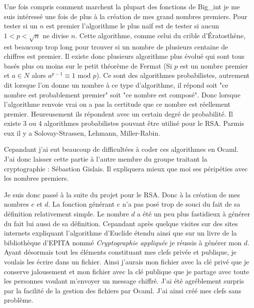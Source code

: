 \documentclass[a4paper,12pt]{article}
\begin{document}
		Une fois compris comment marchent la plupart des fonctions de Big\_int je me suis intéressé une fois de plus à la création de 
		mes grand nombres premiers.	Pour tester si un $n$ est premier l'algorithme le plus naïf est de tester si aucun $1 < p < 
		\sqrt{n} $ ne divise $n$. Cette algorithme, comme celui  du crible d'Ératosthène, est beaucoup trop long pour trouver si un 
		nombre de plusieurs centaine de chiffres est premier. Il existe donc plusieurs algorithme plus évolué qui sont tous basés 
		plus ou moins sur le petit théorème de Fermat (Si $p$ est un nombre premier et $a \in N $ alors $a^{p - 1} \equiv 
		 1 \textrm{ mod } p$). Ce sont des algorithmes probabilistes, autrement dit lorsque l'on donne un nombre à ce type 
		 d'algorithme, il répond soit "ce nombre est probablement premier" soit "ce nombre est composé". Donc lorsque l'algorithme 
		 renvoie vrai on a pas la certitude que ce nombre est réellement premier. Heureusement ils répondent avec un certain degré de 
		 probabilité. Il existe 3 ou 4 algorithmes probabilistes pouvant être utilisé pour le RSA. Parmis eux il y a Solovay-Strassen, 
		 Lehmann, Miller-Rabin.
		 
		 Cepandant j'ai eut beaucoup de difficultées à coder ces algorithmes en Ocaml. J'ai donc laisser cette partie à l'autre membre 
		 du groupe traitant la cryptographie : Sébastion Gislais. Il expliquera mieux que moi ses péripéties avec les nombres 	
		 premiers.
		 
		 Je suis donc passé à la suite du projet pour le RSA. Donc à la création de mes nombres $e$ et $d$. La fonction générant $e$
		 n'a pas posé trop de souci du fait de sa définition relativement simple. Le nombre $d$ a été un peu plus fastidieux à
		 générer du fait lui aussi de sa définition. Cepandant après quelque visites sur des sites internets expliquant l'algorithme
		 d'Euclide étendu ainsi que sur un livre de la bibliothèque d'EPITA nommé \textit{Cryptographie appliquée} je réussis à 
		 générer mon $d$. Ayant désormais tout les éléments constituant mes clefs privée et publique, je voulais les écrire dans
		 un fichier. Ainsi j'aurais mon fichier avec la clé privé que je conserve jalousement et mon fichier avec la clé publique
		 que je partage avec toute les personnes voulant m'envoyer un message chiffré. J'ai été agréblement surpris par la facilité de
		 la gestion des fichiers par Ocaml. J'ai ainsi créé mes clefs sans problème. 
		 
\end{document}
